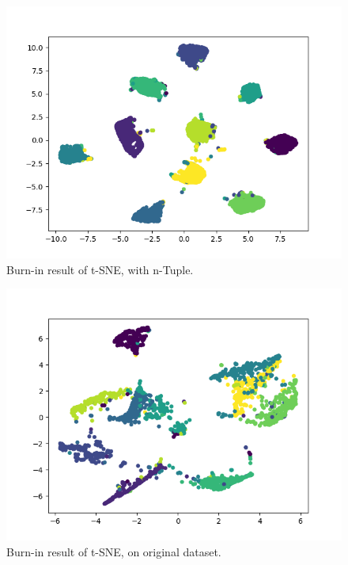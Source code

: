 \documentclass[10pt,twocolumn,letterpaper]{article}
\begin{document}
			\begin{figure}[htbp]
				\begin{center}
					\includegraphics[width=0.9\linewidth]{first_tuple_tsne_burnin}
				\end{center}
				\caption{Burn-in result of t-SNE, with n-Tuple.\label{fig:first_tuple_tsne_burnin}}
			\end{figure}

			\begin{figure}[htbp]
				\begin{center}
					\includegraphics[width=0.9\linewidth]{tsne_burnin}
				\end{center}
				\caption{Burn-in result of t-SNE, on original dataset.\label{fig:tsne_burnin}}
			\end{figure}
\end{document}
